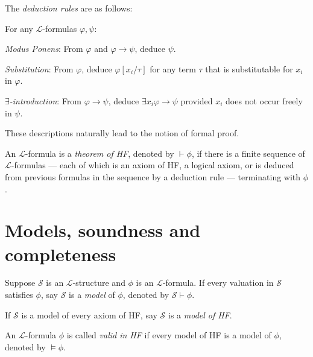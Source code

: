 The \textit{deduction rules} are as follows:

\begin{definition}
    \label{def:prf.MP+Subst+ExIntro}
    For any $\mathcal{L}$-formulas $\varphi, \psi$:
    \begin{description}
        \item \textit{Modus Ponens}: 
        From $\varphi$ and $\varphi \rightarrow \psi$, deduce $\psi$.
        \item \textit{Substitution}:
        From $\varphi$, deduce $\varphi[x_i/\tau]$ for any term $\tau$ that is substitutable for
        $x_i$ in $\varphi$.
        \item \textit{$\exists$-introduction}:
        From $\varphi \rightarrow \psi$, deduce $\exists x_i \varphi \rightarrow \psi$ provided
        $x_i$ does not occur freely in $\psi$.
    \end{description}
\end{definition}

These descriptions naturally lead to the notion of formal proof.

\begin{definition}[Theorem of HF]
    \label{prf}
    An $\mathcal{L}$-formula is a \textit{theorem of HF}, denoted by $\vdash \phi$, 
    if there is a finite sequence of $\mathcal{L}$-formulas — each of which is an axiom of HF, 
    a logical axiom, or is deduced from previous formulas in the sequence by a deduction rule —
    terminating with $\phi$.
\end{definition}

\section{Models, soundness and completeness}

\begin{definition}
    \label{def:models+Model+valid}
    \leanok
    Suppose $\mathcal{S}$ is an $\mathcal{L}$-structure and $\phi$ is an $\mathcal{L}$-formula.
    If every valuation in $\mathcal{S}$ satisfies $\phi$, 
    say $\mathcal{S}$ is a \textit{model} of $\phi$, denoted by $\mathcal{S} \vdash \phi$.

    If $\mathcal{S}$ is a model of every axiom of HF, say $\mathcal{S}$ is a \textit{model of HF}.
    
    An $\mathcal{L}$-formula $\phi$ is called \textit{valid in HF} if 
    every model of HF is a model of $\phi$, denoted by $\vDash \phi$.
\end{definition}

